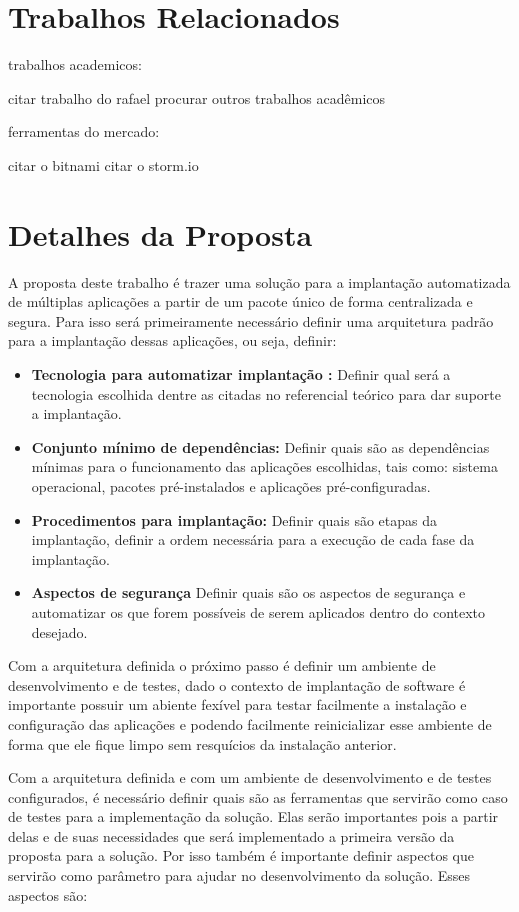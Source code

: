 \section{Trabalhos Relacionados}

trabalhos academicos:

citar trabalho do rafael
procurar outros trabalhos acadêmicos

ferramentas do mercado:

citar o bitnami
citar o storm.io

\section{Detalhes da Proposta}

A proposta deste trabalho é trazer uma solução para a implantação automatizada
de múltiplas aplicações a partir de um pacote único de forma centralizada e segura.
Para isso será primeiramente necessário definir uma arquitetura padrão para a
implantação dessas aplicações, ou seja, definir:

\begin{itemize}
  \item  \textbf{Tecnologia para automatizar implantação :}  Definir qual será a
  tecnologia escolhida dentre as citadas no referencial teórico para dar suporte
  a implantação.
  \item  \textbf{Conjunto mínimo de dependências:} Definir quais são as dependências
  mínimas para o funcionamento das aplicações escolhidas, tais como: sistema operacional,
  pacotes pré-instalados e aplicações pré-configuradas.
  \item  \textbf{Procedimentos para implantação:} Definir quais são etapas da implantação,
  definir a ordem necessária para a execução de cada fase da implantação.
  \item  \textbf{Aspectos de segurança} Definir quais são os aspectos de segurança
  e automatizar os que forem possíveis de serem aplicados dentro do contexto desejado.
\end{itemize}

Com a arquitetura definida o próximo passo é definir um ambiente de desenvolvimento e de
testes, dado o contexto de implantação de software é importante possuir um abiente fexível para
testar facilmente a instalação e configuração das aplicações e podendo facilmente
reinicializar esse ambiente de forma que ele fique limpo sem resquícios da instalação
anterior.

Com a arquitetura definida e com um ambiente de desenvolvimento e de testes configurados, é
necessário definir quais são as ferramentas que servirão como caso de testes
para a implementação da solução. Elas serão importantes pois a partir delas
e de suas necessidades que será implementado a primeira versão da proposta para
a solução. Por isso também é importante definir aspectos que servirão como parâmetro
para ajudar no desenvolvimento da solução. Esses aspectos são:

